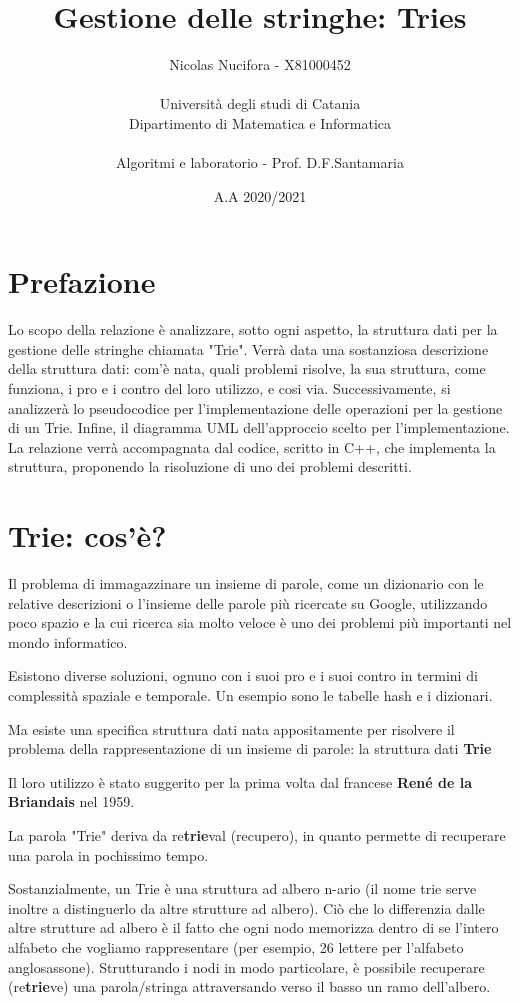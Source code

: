 \documentclass[a4paper, 12pt]{article}
\title{Gestione delle stringhe: Tries}
\author{Nicolas Nucifora - X81000452\\\\Università degli studi di Catania\\ Dipartimento di Matematica e Informatica\\\\Algoritmi e laboratorio - Prof. D.F.Santamaria}
\date{A.A 2020/2021}
\begin{document}
\maketitle
\large
\flushleft
\clearpage

\tableofcontents

\clearpage

\section*{Prefazione}
Lo scopo della relazione è analizzare, sotto ogni aspetto, la struttura dati per la gestione delle stringhe chiamata "Trie". Verrà data una sostanziosa descrizione della struttura dati: com'è nata, quali problemi risolve, la sua struttura, come funziona, i pro e i contro del loro utilizzo, e cosi via. Successivamente, si analizzerà lo pseudocodice per l'implementazione delle operazioni per la gestione di un Trie. Infine, il diagramma UML dell'approccio scelto per l'implementazione.
La relazione verrà accompagnata dal codice, scritto in C++, che implementa la struttura, proponendo la risoluzione di uno dei problemi descritti.

\clearpage

\section{Trie: cos'è?}
Il problema di immagazzinare un insieme di parole, come un dizionario con le relative descrizioni o l'insieme delle parole più ricercate su Google, utilizzando poco spazio e la cui ricerca sia molto veloce è uno dei problemi più importanti nel mondo informatico.

Esistono diverse soluzioni, ognuno con i suoi pro e i suoi contro in termini di complessità spaziale e temporale. Un esempio sono le tabelle hash e i dizionari. 

Ma esiste una specifica struttura dati nata appositamente per risolvere il problema della rappresentazione di un insieme di parole: la struttura dati \textbf{Trie}

Il loro utilizzo è stato suggerito per la prima volta dal francese \textbf{René de la Briandais} nel 1959.

La parola "Trie" deriva da re\textbf{trie}val (recupero), in quanto permette di recuperare una parola in pochissimo tempo. 
\vspace{5mm}

Sostanzialmente, un Trie è una struttura ad albero n-ario (il nome trie serve inoltre a distinguerlo da altre strutture ad albero). Ciò che lo differenzia dalle altre strutture ad albero è il fatto che ogni nodo memorizza dentro di se l'intero alfabeto che vogliamo rappresentare (per esempio, 26 lettere per l'alfabeto anglosassone). Strutturando i nodi in modo particolare, è possibile recuperare (re\textbf{trie}ve) una parola/stringa attraversando verso il basso un ramo dell'albero.
\vspace{5mm}
\end{document}
